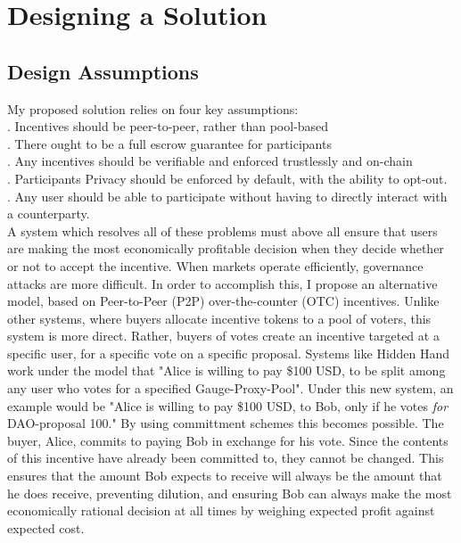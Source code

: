 \documentclass{article}
\begin{document}
\section{Designing a Solution}
\subsection{Design Assumptions}

My proposed solution relies on four key assumptions:\\
    . Incentives should be peer-to-peer, rather than pool-based\\
    . There ought to be a full escrow guarantee for participants \\
    . Any incentives should be verifiable and enforced trustlessly and on-chain\\
    . Participants Privacy should be enforced by default, with the ability to opt-out.\\
    . Any user should be able to participate without having to directly interact with a counterparty.\\

A system which resolves all of these problems must above all ensure that users are making the most economically profitable decision when they decide whether or not to accept the incentive. When markets operate efficiently, governance attacks are more difficult. In order to accomplish this, I propose an alternative model, based on Peer-to-Peer (P2P) over-the-counter (OTC) incentives. Unlike other systems, where buyers allocate incentive tokens to a pool of voters, this system is more direct. Rather, buyers of votes create an incentive targeted at a specific user, for a specific vote on a specific proposal. Systems like Hidden Hand work under the model that "Alice is willing to pay \$100 USD, to be split among any user who votes for a specified Gauge-Proxy-Pool". Under this new system, an example would be "Alice is willing to pay \$100 USD, to Bob, only if he votes \emph{for} DAO-proposal 100." By using committment schemes this becomes possible. The buyer, Alice, commits to paying Bob in exchange for his vote. Since the contents of this incentive have already been committed to, they cannot be changed. This ensures that the amount Bob expects to receive will always be the amount that he does receive, preventing dilution, and ensuring Bob can always make the most economically rational decision at all times by weighing expected profit against expected cost.
\end{document}
